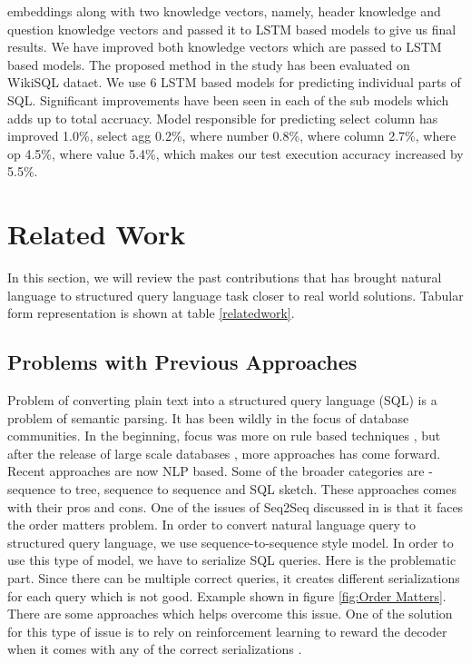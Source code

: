 \documentclass[12pt]{article}
\begin{document}
embeddings along with two knowledge vectors, namely, header knowledge
and question knowledge vectors and passed it to LSTM based models to give
us final results. We have improved both knowledge vectors which are passed
to LSTM based models. The proposed method in the study has been evaluated on WikiSQL dataet. We use 6 LSTM based models for predicting
individual parts of SQL. Significant improvements have been seen in each
of the sub models which adds up to total accruacy. Model responsible for
predicting select column has improved 1.0\%, select agg 0.2\%, where number
0.8\%, where column 2.7\%, where op 4.5\%, where value 5.4\%, which makes
our test execution accuracy increased by 5.5\%.
 


\newpage

\section{Related Work}

In this section, we will review the past contributions that has brought natural language to structured query language task closer to real world solutions. Tabular form representation is shown at table \ref{relatedwork}.

\subsection{Problems with Previous Approaches}

Problem of converting plain text into a structured query language (SQL) is a problem of semantic parsing. It has been wildly in the focus of database communities. In the beginning, focus was more on rule based techniques \cite{setlur2016eviza}, but after the release of large scale databases \cite{yu2018spider} \cite{zhong2017seq2sql}, more approaches has come forward. Recent approaches are now NLP based. Some of the broader categories are - sequence to tree, sequence to sequence and SQL sketch. These approaches comes with their pros and cons. One of the issues of Seq2Seq discussed in \cite{xu2017sqlnet} is that it faces the order matters problem. In order to convert natural language query to
structured query language, we use sequence-to-sequence style model. In order to use this type of model, we have to serialize SQL queries. Here is the problematic part. Since there can be multiple correct queries, it creates different serializations for each query which is not good. Example shown in figure \ref{fig:Order Matters}. There are some approaches which helps overcome this issue. One of the solution for this type of issue is to rely on reinforcement learning to reward the decoder when it comes with any of the correct serializations \cite{xu2017sqlnet}. 
\end{document}
